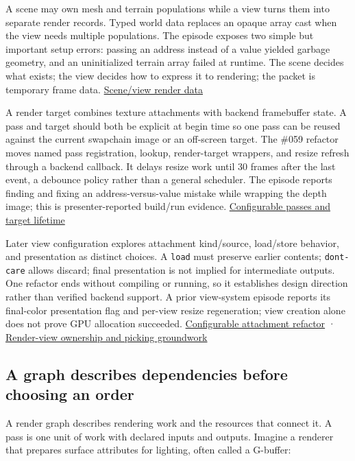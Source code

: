 A scene may own mesh and terrain populations while a view turns them into separate render records. Typed world data replaces an opaque array cast when the view needs multiple populations. The episode exposes two simple but important setup errors: passing an address instead of a value yielded garbage geometry, and an uninitialized terrain array failed at runtime. The scene decides what exists; the view decides how to express it to rendering; the packet is temporary frame data. \href{https://www.youtube.com/watch?v=JgMCoxs0nqo}{Scene/view render data}

A render target combines texture attachments with backend framebuffer state. A pass and target should both be explicit at begin time so one pass can be reused against the current swapchain image or an off-screen target. The \#059 refactor moves named pass registration, lookup, render-target wrappers, and resize refresh through a backend callback. It delays resize work until 30 frames after the last event, a debounce policy rather than a general scheduler. The episode reports finding and fixing an address-versus-value mistake while wrapping the depth image; this is presenter-reported build/run evidence. \href{https://www.youtube.com/watch?v=tZjc_hSaUA4}{Configurable passes and target lifetime}

Later view configuration explores attachment kind/source, load/store behavior, and presentation as distinct choices. A \texttt{load} must preserve earlier contents; \texttt{dont-care} allows discard; final presentation is not implied for intermediate outputs. One refactor ends without compiling or running, so it establishes design direction rather than verified backend support. A prior view-system episode reports its final-color presentation flag and per-view resize regeneration; view creation alone does not prove GPU allocation succeeded. \href{https://www.youtube.com/watch?v=wjiCBUXFVow}{Configurable attachment refactor} · \href{https://www.youtube.com/watch?v=akxXEfbZcrk}{Render-view ownership and picking groundwork}

\subsection{A graph describes dependencies before choosing an order}\label{06-engine-ii-ch026-a-graph-describes-dependencies-before-choosing-an-order}

A render graph describes rendering work and the resources that connect it. A pass is one unit of work with declared inputs and outputs. Imagine a renderer that prepares surface attributes for lighting, often called a G-buffer:

